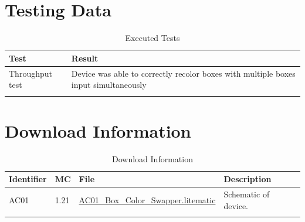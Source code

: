 \documentclass[10pt]{datasheet}
\begin{document}
\section{Testing Data}
\begin{table}[H]
\caption{Executed Tests}
\begin{tabularx}{\textwidth}{l | X}
    \thickhline
    \textbf{Test} & \textbf{Result} \\
    \hline
    Throughput test & Device was able to correctly recolor boxes with multiple boxes input simultaneously \\
    \thickhline
\end{tabularx}
\end{table}

\section{Download Information}
\begin{table}[H]
    \caption{Download Information}
    \begin{tabularx}{\textwidth}{l | l | l | X}
        \thickhline
        \textbf{Identifier} & \textbf{MC} & \textbf{File} & \textbf{Description} \\
        \hline
        AC01 & 1.21 & \href{https://github.com/Soontech-Annals/Archive/blob/2b73adfd252c5e2cf9d202454dbef78a586bc482/Archive/autocrafting/AC01\%20Box\%20Color\%20Swapper/AC01\_Box\_Color\_Swapper.litematic?raw=1}{AC01\_Box\_Color\_Swapper.litematic} & Schematic of device. \\
        \hline
        \thickhline
    \end{tabularx}
\end{table}
\end{document}
